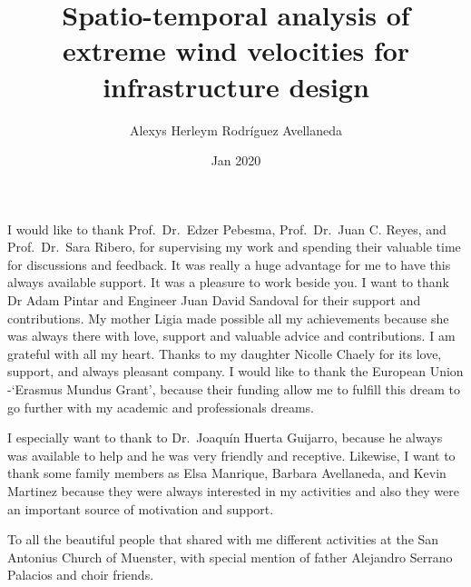 \documentclass[12pt,oneside]{reedthesis}
\title{Spatio-temporal analysis of extreme wind velocities for infrastructure design}
\author{Alexys Herleym Rodríguez Avellaneda}
\date{Jan 2020}
\begin{document}
  \maketitle

\frontmatter %
\pagestyle{empty} %
  \begin{acknowledgements}
    I would like to thank Prof.~Dr.~Edzer Pebesma, Prof.~Dr.~Juan C. Reyes, and Prof.~Dr.~Sara Ribero, for supervising my work and spending their valuable time for discussions and feedback. It was really a huge advantage for me to have this always available support. It was a pleasure to work beside you. I want to thank Dr Adam Pintar and Engineer Juan David Sandoval for their support and contributions. My mother Ligia made possible all my achievements because she was always there with love, support and valuable advice and contributions. I am grateful with all my heart. Thanks to my daughter Nicolle Chaely for its love, support, and always pleasant company. I would like to thank the European Union -`Erasmus Mundus Grant', because their funding allow me to fulfill this dream to go further with my academic and professionals dreams.
    
    \par
    
    I especially want to thank to Dr.~Joaquín Huerta Guijarro, because he always was available to help and he was very friendly and receptive. Likewise, I want to thank some family members as Elsa Manrique, Barbara Avellaneda, and Kevin Martinez because they were always interested in my activities and also they were an important source of motivation and support.
    
    \par
    
    To all the beautiful people that shared with me different activities at the San Antonius Church of Muenster, with special mention of father Alejandro Serrano Palacios and choir friends.
  \end{acknowledgements}
\end{document}
